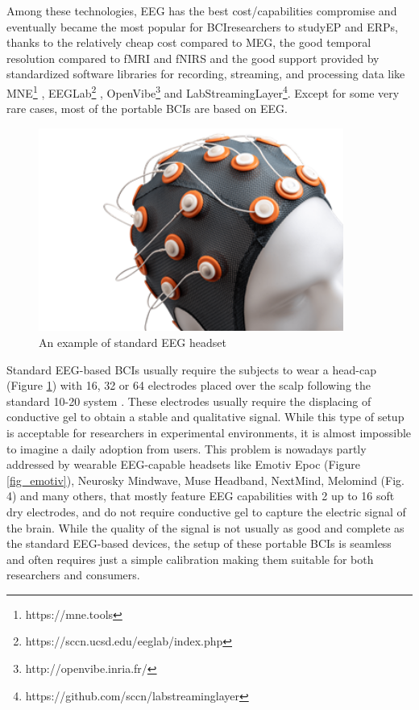 Among these technologies, \ac{EEG} has the best cost/capabilities compromise and eventually became the most popular for \ac{BCI}researchers to study\ac{EP} and \ac{ERPs}, thanks to the relatively cheap cost compared to \ac{MEG}, the good temporal resolution compared to \ac{fMRI} and \ac{fNIRS} and the good support provided by standardized software libraries for recording, streaming, and processing data like MNE\footnote{https://mne.tools} , EEGLab\footnote{https://sccn.ucsd.edu/eeglab/index.php} , OpenVibe\footnote{http://openvibe.inria.fr/}  and LabStreamingLayer\footnote{https://github.com/sccn/labstreaminglayer}. Except for some very rare cases, most of the portable \ac{BCIs} are based on \ac{EEG}.
\begin{figure}[h]
\includegraphics[width=10cm]{img/background/eeg_headcap.png}
\centering
\caption{An example of standard EEG headset}\label{fig_eeg_headcap}
\end{figure}
Standard EEG-based \ac{BCIs} usually require the subjects to wear a head-cap (Figure \ref{fig_eeg_headcap}) with 16, 32 or 64 electrodes placed over the scalp following the standard 10-20 system . These electrodes usually require the displacing of conductive gel to obtain a stable and qualitative signal. While this type of setup is acceptable for researchers in experimental environments, it is almost impossible to imagine a daily adoption from users. This problem is nowadays partly addressed by wearable EEG-capable headsets like Emotiv Epoc (Figure \ref{fig_emotiv}), Neurosky Mindwave, Muse Headband, NextMind, Melomind (Fig. 4) and many others, that mostly feature EEG capabilities with 2 up to 16 soft dry electrodes, and do not require conductive gel to capture the electric signal of the brain. While the quality of the signal is not usually as good and complete as the standard EEG-based devices, the setup of these portable \ac{BCIs} is seamless and often requires just a simple calibration making them suitable for both researchers and consumers.
